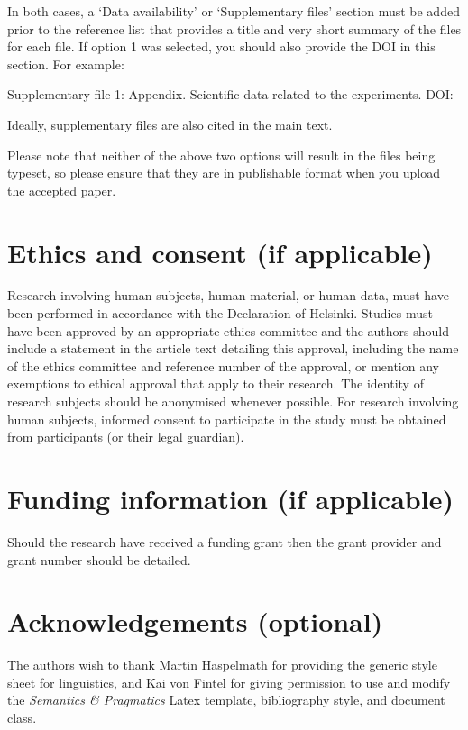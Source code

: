 \documentclass[times,linguex]{glossa}
\begin{document}
\noindent In both cases, a `Data availability' or `Supplementary files' section must be added prior to the reference list that provides a title and very short summary of the files for each file. If option 1 was selected, you should also provide the DOI in this section. For example:

\noindent Supplementary file 1: Appendix. Scientific data related to the experiments. DOI: 

Ideally, supplementary files are also cited in the main text.

Please note that neither of the above two options will result in the files being typeset, so please ensure that they are in publishable format when you upload the accepted paper.


\section*{Ethics and consent (if applicable)}

Research involving human subjects, human material, or human data, must have been performed in accordance with the Declaration of Helsinki. Studies must have been approved by an appropriate ethics committee and the authors should include a statement in the article text detailing this approval, including the name of the ethics committee and reference number of the approval, or mention any exemptions to ethical approval that apply to their research. The identity of research subjects should be anonymised whenever possible. For research involving human subjects, informed consent to participate in the study must be obtained from participants (or their legal guardian).


\section*{Funding information (if applicable)}

Should the research have received a funding grant then the grant provider and grant number should be detailed.

\section*{Acknowledgements (optional)}

The authors wish to thank Martin Haspelmath for providing the generic style sheet for linguistics, and Kai von Fintel for giving permission to use and modify the \textit{Semantics \& Pragmatics} Latex template, bibliography style, and document class.
\end{document}
